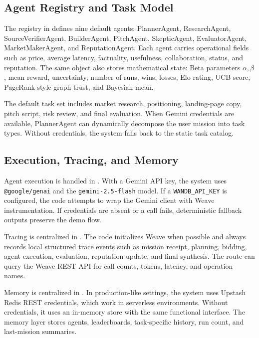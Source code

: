 \subsection{Agent Registry and Task Model}

The registry in  defines nine default agents: PlannerAgent, ResearchAgent, SourceVerifierAgent, BuilderAgent, PitchAgent, SkepticAgent, EvaluatorAgent, MarketMakerAgent, and ReputationAgent. Each agent carries operational fields such as price, average latency, factuality, usefulness, collaboration, status, and reputation. The same object also stores mathematical state: Beta parameters \(\alpha,\beta\), mean reward, uncertainty, number of runs, wins, losses, Elo rating, UCB score, PageRank-style graph trust, and Bayesian mean.

The default task set includes market research, positioning, landing-page copy, pitch script, risk review, and final evaluation. When Gemini credentials are available, PlannerAgent can dynamically decompose the user mission into task types. Without credentials, the system falls back to the static task catalog.

\subsection{Execution, Tracing, and Memory}

Agent execution is handled in . With a Gemini API key, the system uses \texttt{@google/genai} and the \texttt{gemini-2.5-flash} model. If a \texttt{WANDB\_API\_KEY} is configured, the code attempts to wrap the Gemini client with Weave instrumentation. If credentials are absent or a call fails, deterministic fallback outputs preserve the demo flow.

Tracing is centralized in . The code initializes Weave when possible and always records local structured trace events such as mission receipt, planning, bidding, agent execution, evaluation, reputation update, and final synthesis. The route  can query the Weave REST API for call counts, tokens, latency, and operation names.

Memory is centralized in . In production-like settings, the system uses Upstash Redis REST credentials, which work in serverless environments. Without credentials, it uses an in-memory store with the same functional interface. The memory layer stores agents, leaderboards, task-specific history, run count, and last-mission summaries.
